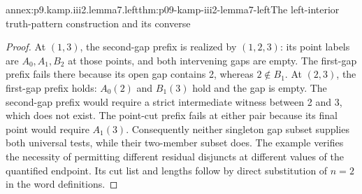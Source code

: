 \begin{annexitem}{annex:p9.kamp.iii2.lemma7.left}{thm:p09-kamp-iii2-lemma7-left}{The left-interior truth-pattern construction and its converse}
\begin{proof}
At \((1,3)\), the second-gap prefix is realized by \((1,2,3)\):
its point labels are \(A_0,A_1,B_2\) at those points, and
both intervening gaps are empty. The first-gap prefix fails there
because its open gap contains 2, whereas \(2\notin B_1\).
At \((2,3)\), the first-gap prefix holds: \(A_0(2)\) and
\(B_1(3)\) hold and the gap is empty. The second-gap prefix
would require a strict intermediate witness between 2 and 3, which
does not exist. The point-cut prefix fails at either pair because
its final point would require \(A_1(3)\).
Consequently neither singleton gap subset supplies both universal
tests, while their two-member subset does. The example verifies
the necessity of permitting different residual disjuncts at different
values of the quantified endpoint. Its cut list and lengths follow
by direct substitution of \(n=2\) in the word definitions.
\end{proof}
\end{annexitem}

